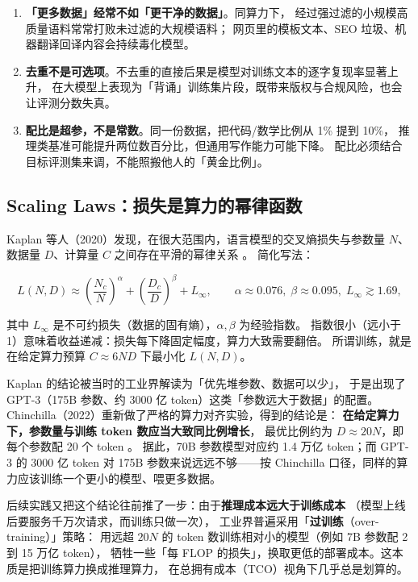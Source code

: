 \begin{pitfall}[数据工程的三个反直觉发现]
\begin{enumerate}
  \item \textbf{「更多数据」经常不如「更干净的数据」}。同算力下，
        经过强过滤的小规模高质量语料常常打败未过滤的大规模语料；
        网页里的模板文本、SEO 垃圾、机器翻译回译内容会持续毒化模型。
  \item \textbf{去重不是可选项}。不去重的直接后果是模型对训练文本的逐字复现率显著上升，
        在大模型上表现为「背诵」训练集片段，既带来版权与合规风险，也会让评测分数失真。
  \item \textbf{配比是超参，不是常数}。同一份数据，把代码/数学比例从 1\% 提到 10\%，
        推理类基准可能提升两位数百分比，但通用写作能力可能下降。
        配比必须结合目标评测集来调，不能照搬他人的「黄金比例」。
\end{enumerate}
\end{pitfall}

\subsection{Scaling Laws：损失是算力的幂律函数}

Kaplan 等人（2020）发现，在很大范围内，语言模型的交叉熵损失与参数量 $N$、
数据量 $D$、计算量 $C$ 之间存在平滑的幂律关系 \cite{kaplan2020scaling}。
简化写法：

\begin{equation}
L(N, D) \approx \left( \frac{N_c}{N} \right)^{\alpha} + \left( \frac{D_c}{D} \right)^{\beta} + L_\infty ,
\qquad \alpha \approx 0.076,\; \beta \approx 0.095,\; L_\infty \gtrsim 1.69 ,
\label{eq:scaling-law}
\end{equation}

其中 $L_\infty$ 是不可约损失（数据的固有熵），$\alpha, \beta$ 为经验指数。
指数很小（远小于 1）意味着收益递减：损失每下降固定幅度，算力大致需要翻倍。
所谓训练，就是在给定算力预算 $C \approx 6ND$ 下最小化 $L(N,D)$。

\begin{insight}
Kaplan 的结论被当时的工业界解读为「优先堆参数、数据可以少」，
于是出现了 GPT-3（175B 参数、约 3000 亿 token）这类「参数远大于数据」的配置。
Chinchilla（2022）重新做了严格的算力对齐实验，得到的结论是：
\textbf{在给定算力下，参数量与训练 token 数应当大致同比例增长}，
最优比例约为 $D \approx 20N$，即每个参数配 20 个 token \cite{hoffmann2022chinchilla}。
据此，70B 参数模型对应约 1.4 万亿 token；而 GPT-3 的 3000 亿 token
对 175B 参数来说远远不够——按 Chinchilla 口径，同样的算力应该训练一个更小的模型、喂更多数据。

后续实践又把这个结论往前推了一步：由于\textbf{推理成本远大于训练成本}
（模型上线后要服务千万次请求，而训练只做一次），
工业界普遍采用「\textbf{过训练}（over-training）」策略：
用远超 $20N$ 的 token 数训练相对小的模型（例如 7B 参数配 2 到 15 万亿 token），
牺牲一些「每 FLOP 的损失」，换取更低的部署成本。这本质是把训练算力换成推理算力，
在总拥有成本（TCO）视角下几乎总是划算的。
\end{insight}

